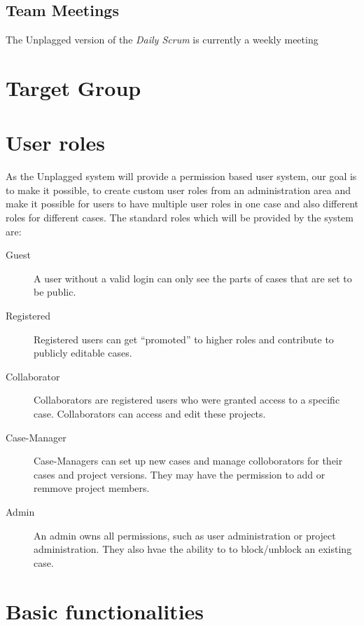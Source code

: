 \subsection{Team Meetings}

The Unplagged version of the \textit{Daily Scrum} is currently a weekly meeting


\section{Target Group}

\section{User roles}
As the Unplagged system will provide a permission based user system, our goal is to make it possible, to create custom user roles from an administration area and make it possible for users to have multiple user roles in one case and also different roles for different cases.
The standard roles which will be provided by the system are:

\begin{description}
\item[Guest]
A user without a valid login can only see the parts of cases that are set to be public.
\item[Registered]
Registered users can get \enquote{promoted} to higher roles and contribute to publicly editable cases.
\item[Collaborator]
Collaborators are registered users who were granted access to a specific case. Collaborators can access and edit these projects.
\item[Case-Manager]
Case-Managers can set up new cases and manage colloborators for their cases and project versions. They may have the permission to add or remmove project members.
\item[Admin]
An admin owns all permissions, such as user administration or project administration. They also hvae the ability to to block/unblock an existing case.
\end{description}

\section{Basic functionalities}

